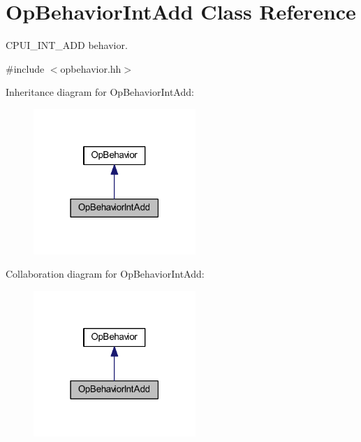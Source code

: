 \hypertarget{class_op_behavior_int_add}{}\section{Op\+Behavior\+Int\+Add Class Reference}
\label{class_op_behavior_int_add}


C\+P\+U\+I\+\_\+\+I\+N\+T\+\_\+\+A\+DD behavior.  




{\ttfamily \#include $<$opbehavior.\+hh$>$}



Inheritance diagram for Op\+Behavior\+Int\+Add\+:
\nopagebreak
\begin{figure}[H]
\begin{center}
\leavevmode
\includegraphics[width=174pt]{class_op_behavior_int_add__inherit__graph}
\end{center}
\end{figure}


Collaboration diagram for Op\+Behavior\+Int\+Add\+:
\nopagebreak
\begin{figure}[H]
\begin{center}
\leavevmode
\includegraphics[width=174pt]{class_op_behavior_int_add__coll__graph}
\end{center}
\end{figure}
